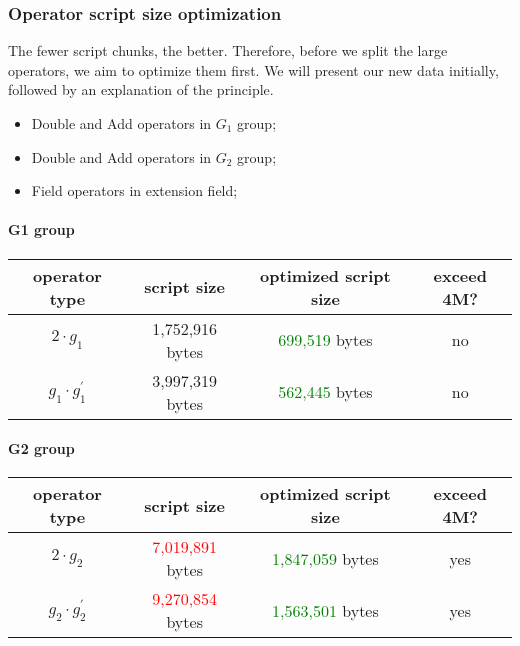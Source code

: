\subsubsection{Operator script size optimization}

The fewer script chunks, the better. Therefore, before we split the large operators, we aim to optimize them first. We will present our new 
data initially, followed by an explanation of the principle.

\begin{itemize}
    \item Double and Add operators in $G_1$ group;
    \item Double and Add operators in $G_2$ group;
    \item Field operators in extension field;
\end{itemize}

\paragraph*{G1 group}

\begin{center}
\begin{tabular}{|c|c|c|c|} \hline
operator type & script size & optimized script size & exceed 4M? \\ \hline
$2 \cdot g_1$ & 1,752,916 bytes & \textcolor{green}{699,519} bytes & no  \\ \hline
$g_1 \cdot g_1^{'}$ & 3,997,319 bytes &	\textcolor{green}{562,445} bytes & no \\ \hline
\end{tabular}
\end{center}

\paragraph*{G2 group}

\begin{center}
\begin{tabular}{|c|c|c|c|} \hline
operator type & script size & optimized script size & exceed 4M? \\ \hline
$2 \cdot g_2$ & \textcolor{red}{7,019,891} bytes & \textcolor{green}{1,847,059} bytes & yes  \\ \hline
$g_2 \cdot g_2^{'}$ & \textcolor{red}{9,270,854} bytes & \textcolor{green}{1,563,501} bytes & yes \\ \hline
\end{tabular}
\end{center}

